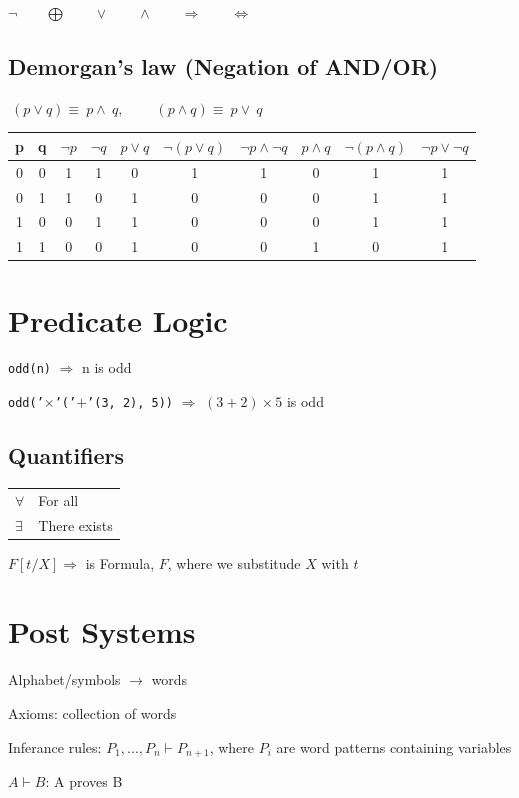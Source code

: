 \documentclass[12pt]{article}
\begin{document}
\begin{spacing}{1.5}
$\neg \qquad \bigoplus \qquad \vee \qquad \wedge \qquad \Rightarrow \qquad \Leftrightarrow$

\subsection{Demorgan's law (Negation of AND/OR)}

$~(p \vee q) \equiv ~p \wedge ~q, \qquad ~(p \wedge q) \equiv ~p \vee ~q$

\vspace{0.6cm}

\begin{tabular}{cc | cc | ccc | ccc}
p & q & $\neg p$ & $\neg q$ & $p \vee q$ & $\neg (p \vee q)$ & $\neg p \wedge \neg q$ & $p \wedge q$ & $\neg (p \wedge q)$ & $\neg p \vee \neg q$ \\
\hline 
0 & 0 & 1 & 1 & 0 & 1 & 1 & 0 & 1 & 1 \\ 
0 & 1 & 1 & 0 & 1 & 0 & 0 & 0 & 1 & 1 \\
1 & 0 & 0 & 1 & 1 & 0 & 0 & 0 & 1 & 1 \\
1 & 1 & 0 & 0 & 1 & 0 & 0 & 1 & 0 & 1 \\
\end{tabular}

\section{Predicate Logic}

\texttt{odd(n)} $\Rightarrow$ n is odd

\texttt{odd('$\times$'('$+$'(3, 2), 5))} $\Rightarrow$ $(3+2) \times 5$ is odd

\subsection{Quantifiers}

\begin{tabular}{l | l}
$\forall$ & For all \\
$\exists$ & There exists
\end{tabular}

$F[t/X] \Rightarrow $ is Formula, $F$, where we substitude $X$ with $t$

\section{Post Systems}

\begin{itemize*}
	\item Alphabet/symbols $\rightarrow$ words
	\item Axioms: collection of words
	\item Inferance rules: $P_1, ... , P_n \vdash P_{n+1} $, where $P_i$ are word patterns containing variables
	\item $A \vdash B$: A proves B
\end{itemize*}


\end{spacing}
\end{document}
